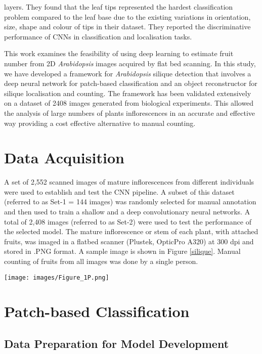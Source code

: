 \documentclass[a4paper,num-refs]{oup-contemporary}
\begin{document}
layers. They found that the leaf tips represented the hardest classification problem compared to the leaf base due to the existing variations in orientation, size, shape and colour of tips in their dataset. They reported the discriminative performance of CNNs in classification and localisation tasks.

This work examines the feasibility of using deep learning to estimate fruit number from 2D \textit{Arabidopsis} images acquired by flat bed scanning. In this study, we have developed a framework for \textit{Arabidopsis} silique detection that involves a deep neural network for patch-based classification and an object reconstructor for silique localisation and counting. The framework has been validated extensively on a dataset of 2408 images generated from biological experiments. This allowed the analysis of large numbers of plants inflorescences in an accurate and effective way providing a cost effective alternative to manual counting.

\section{Data Acquisition}
A set of 2,552 scanned images of mature inflorescences from different individuals were used to establish and test the CNN pipeline. A subset of this dataset (referred to as Set-1 = 144 images) was randomly selected for manual annotation and then used to train a shallow and a deep convolutionary neural networks. A total of 2,408 images (referred to as Set-2) were used to test the performance of the selected model. The mature inflorescence or stem of each plant, with attached fruits, was imaged in a flatbed scanner (Plustek, OpticPro A320) at 300 dpi and stored in .PNG format. A sample image is shown in Figure \ref{silique}. Manual counting of fruits from all images was done by a single person. 
\begin{figure*}[!ht]
	\centering		\texttt{[image: images/Figure\_1P.png]}
	\caption{Example image and features used for classifier annotation.}
	\label{silique}
\end{figure*}
\section{Patch-based Classification}\label{patchclasiffication}
\subsection{Data Preparation for Model Development}
\end{document}
